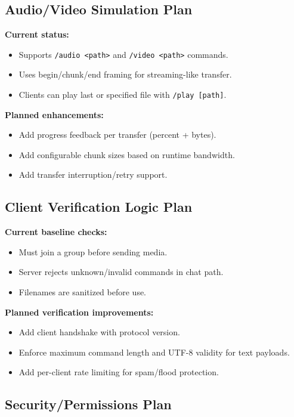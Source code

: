 \documentclass[12pt,letterpaper]{article}
\begin{document}
\subsection{Audio/Video Simulation Plan}

\noindent\textbf{Current status:}
\begin{itemize}[leftmargin=1.5em]
  \item Supports \texttt{/audio <path>} and \texttt{/video <path>} commands.
  \item Uses begin/chunk/end framing for streaming-like transfer.
  \item Clients can play last or specified file with \texttt{/play [path]}.
\end{itemize}

\noindent\textbf{Planned enhancements:}
\begin{itemize}[leftmargin=1.5em]
  \item Add progress feedback per transfer (percent + bytes).
  \item Add configurable chunk sizes based on runtime bandwidth.
  \item Add transfer interruption/retry support.
\end{itemize}

\subsection{Client Verification Logic Plan}

\noindent\textbf{Current baseline checks:}
\begin{itemize}[leftmargin=1.5em]
  \item Must join a group before sending media.
  \item Server rejects unknown/invalid commands in chat path.
  \item Filenames are sanitized before use.
\end{itemize}

\noindent\textbf{Planned verification improvements:}
\begin{itemize}[leftmargin=1.5em]
  \item Add client handshake with protocol version.
  \item Enforce maximum command length and UTF-8 validity for text payloads.
  \item Add per-client rate limiting for spam/flood protection.
\end{itemize}

\subsection{Security/Permissions Plan}
\end{document}
